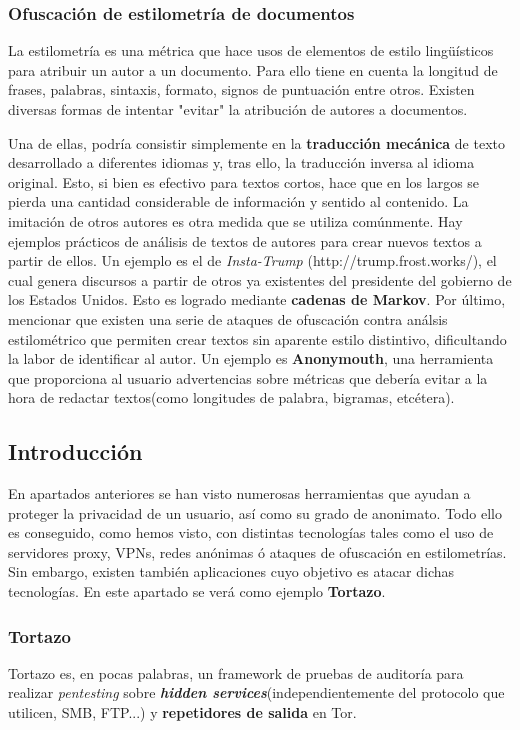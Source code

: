 \subsubsection{Ofuscación de estilometría de documentos}

La estilometría es una métrica que hace usos de elementos de estilo
lingüísticos para atribuir un autor a un documento. Para ello tiene en
cuenta la longitud de frases, palabras, sintaxis, formato, signos de
puntuación entre otros.  Existen diversas formas de intentar "evitar"
la atribución de autores a documentos.

Una de ellas, podría consistir simplemente en la \textbf{traducción
  mecánica} de texto desarrollado a diferentes idiomas y, tras ello,
la traducción inversa al idioma original. Esto, si bien es efectivo
para textos cortos, hace que en los largos se pierda una cantidad
considerable de información y sentido al contenido.  La imitación de
otros autores es otra medida que se utiliza comúnmente. Hay ejemplos
prácticos de análisis de textos de autores para crear nuevos textos a
partir de ellos. Un ejemplo es el de \textit{Insta-Trump}
(http://trump.frost.works/), el cual genera discursos a partir de
otros ya existentes del presidente del gobierno de los Estados
Unidos. Esto es logrado mediante \textbf{cadenas de Markov}.  Por
último, mencionar que existen una serie de ataques de ofuscación
contra análsis estilométrico que permiten crear textos sin aparente
estilo distintivo, dificultando la labor de identificar al autor.  Un
ejemplo es \textbf{Anonymouth}, una herramienta que proporciona al
usuario advertencias sobre métricas que debería evitar a la hora de
redactar textos(como longitudes de palabra, bigramas, etcétera).

 \label{sec:identificacion}
\subsection{Introducción}

En apartados anteriores se han visto numerosas herramientas que ayudan
a proteger la privacidad de un usuario, así como su grado de
anonimato. Todo ello es conseguido, como hemos visto, con distintas
tecnologías tales como el uso de servidores proxy, VPNs, redes
anónimas ó ataques de ofuscación en estilometrías.  Sin embargo,
existen también aplicaciones cuyo objetivo es atacar dichas
tecnologías. En este apartado se verá como ejemplo \textbf{Tortazo}.

\subsubsection{Tortazo}
Tortazo es, en pocas palabras, un framework de pruebas de auditoría
para realizar \textit{pentesting} sobre \textit{\textbf{hidden
    services}}(independientemente del protocolo que utilicen, SMB,
FTP...) y \textbf{repetidores de salida} en Tor.

